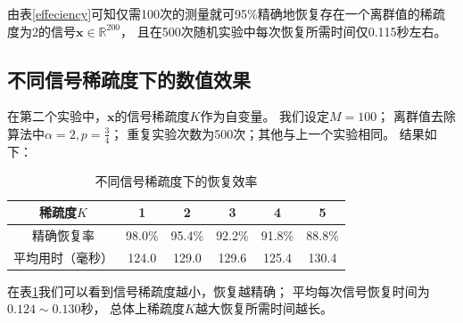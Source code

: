 \documentclass[AutoFakeBold]{LZUThesis}
\begin{document}
由表\ref{effeciency}可知仅需100次的测量就可95\%精确地恢复存在一个离群值的稀疏度为2的信号$\mathbf{x} \in \mathbb{R}^{200}$，
且在500次随机实验中每次恢复所需时间仅0.115秒左右。

\subsection{不同信号稀疏度下的数值效果}

在第二个实验中，$\mathbf{x}$的信号稀疏度$K$作为自变量。
我们设定$M = 100$；
离群值去除算法中$\alpha = 2, p = \frac{3}{4}$；
重复实验次数为500次；其他与上一个实验相同。
结果如下：

\begin{table}[H]
    \centering
    \caption{不同信号稀疏度下的恢复效率}
    \begin{tabular}{cccccc} %
        \toprule
        稀疏度$K$ & 1  & 2  & 3  & 4 & 5\\
        \toprule
        精确恢复率 & 98.0\% & 95.4\% & 92.2\%  & 91.8\% & 88.8\%\\
        \midrule
        平均用时（毫秒） & 124.0 & 129.0 & 129.6 &  125.4 & 130.4\\
        \bottomrule
    \end{tabular}
    \label{diff_sprs}
\end{table}

在表\ref{diff_sprs}我们可以看到信号稀疏度越小，恢复越精确；
平均每次信号恢复时间为$0.124 \sim 0.130$秒，
总体上稀疏度$K$越大恢复所需时间越长。



\end{document}
